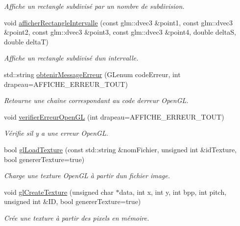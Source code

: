 \begin{DoxyCompactItemize}
\begin{DoxyCompactList}\small\item\em Affiche un rectangle subdivisé par un nombre de subdivision. \end{DoxyCompactList}\item 
\hypertarget{namespaceaidegl_a6775d81c7b7b695dcfb3f3d50cc253a5}{}void \hyperlink{namespaceaidegl_a6775d81c7b7b695dcfb3f3d50cc253a5}{afficher\+Rectangle\+Intervalle} (const glm\+::dvec3 \&point1, const glm\+::dvec3 \&point2, const glm\+::dvec3 \&point3, const glm\+::dvec3 \&point4, double delta\+S, double delta\+T)\label{namespaceaidegl_a6775d81c7b7b695dcfb3f3d50cc253a5}

\begin{DoxyCompactList}\small\item\em Affiche un rectangle subdivisé d\textquotesingle{}un intervalle. \end{DoxyCompactList}\item 
std\+::string \hyperlink{namespaceaidegl_a19ef7b4b71b7a1568393cfc78be46a91}{obtenir\+Message\+Erreur} (G\+Lenum code\+Erreur, int drapeau=A\+F\+F\+I\+C\+H\+E\+\_\+\+E\+R\+R\+E\+U\+R\+\_\+\+T\+O\+U\+T)
\begin{DoxyCompactList}\small\item\em Retourne une chaîne correspondant au code d\textquotesingle{}erreur Open\+G\+L. \end{DoxyCompactList}\item 
void \hyperlink{namespaceaidegl_a923ac6c4f17f9d93b072c786e0f86d41}{verifier\+Erreur\+Open\+G\+L} (int drapeau=A\+F\+F\+I\+C\+H\+E\+\_\+\+E\+R\+R\+E\+U\+R\+\_\+\+T\+O\+U\+T)
\begin{DoxyCompactList}\small\item\em Vérifie s\textquotesingle{}il y a une erreur Open\+G\+L. \end{DoxyCompactList}\item 
bool \hyperlink{namespaceaidegl_a6bba7d34e4998b9c94fe5971ecf535c0}{gl\+Load\+Texture} (const std\+::string \&nom\+Fichier, unsigned int \&id\+Texture, bool generer\+Texture=true)
\begin{DoxyCompactList}\small\item\em Charge une texture Open\+G\+L à partir d\textquotesingle{}un fichier image. \end{DoxyCompactList}\item 
void \hyperlink{namespaceaidegl_af6f5a219dd414d647d8e4d92b6c30fd5}{gl\+Create\+Texture} (unsigned char $\ast$data, int x, int y, int bpp, int pitch, unsigned int \&I\+D, bool generer\+Texture=true)
\begin{DoxyCompactList}\small\item\em Crée une texture à partir des pixels en mémoire. \end{DoxyCompactList}\end{DoxyCompactItemize}


